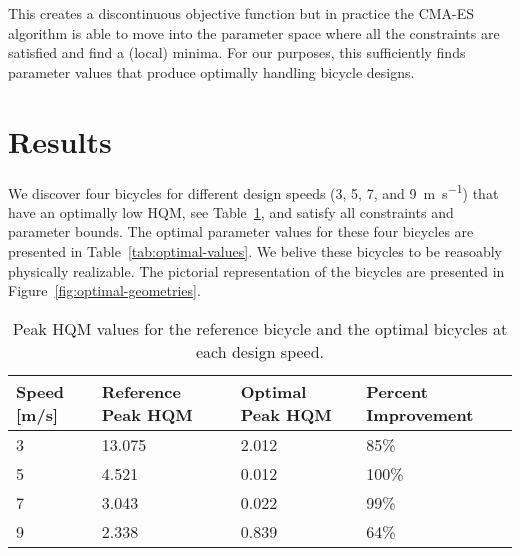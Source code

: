 \documentclass{bmd2019a}
\begin{document}
This creates a discontinuous objective function but in practice the CMA-ES
algorithm is able to move into the parameter space where all the constraints
are satisfied and find a (local) minima. For our purposes, this sufficiently
finds parameter values that produce optimally handling bicycle designs.

\section{Results}
%
We discover four bicycles for different design speeds (3, 5, 7, and
9~\si{\meter\per\second}) that have an optimally low HQM, see
Table~\ref{tab:hqm}, and satisfy all constraints and parameter bounds. The
optimal parameter values for these four bicycles are presented in
Table~\ref{tab:optimal-values}. We belive these bicycles to be reasoably
physically realizable. The pictorial representation of the bicycles are
presented in Figure~\ref{fig:optimal-geometries}.
%
\begin{table}
  \caption{Peak HQM values for the reference bicycle and the optimal bicycles
    at each design speed.}
  \label{tab:hqm}
  \centering
  \begin{tabular}{llll}
    \toprule
    Speed [m/s] & Reference Peak HQM & Optimal Peak HQM & Percent Improvement \\
    \midrule
    3 & 13.075 & 2.012 & 85\% \\
    5 & 4.521  & 0.012 & 100\% \\
    7 & 3.043  & 0.022 & 99\% \\
    9 & 2.338  & 0.839 & 64\% \\
    \bottomrule
  \end{tabular}
\end{table}
%
\end{document}
